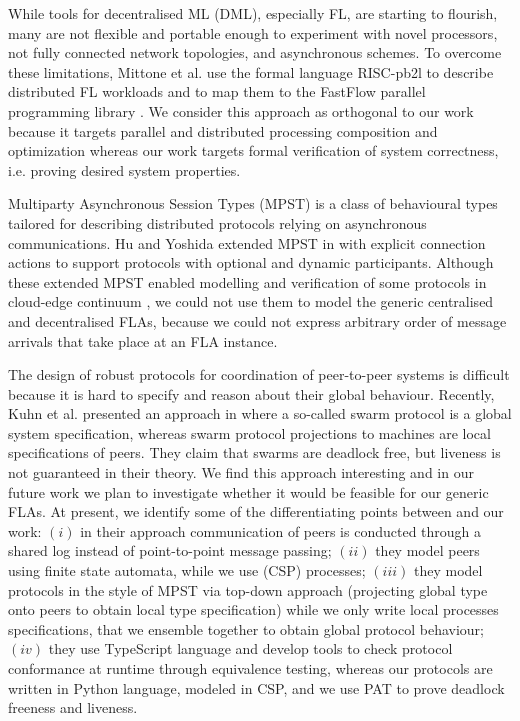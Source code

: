 \documentclass[runningheads]{llncs}
\begin{document}
While tools for decentralised ML (DML), especially FL, are starting to flourish, many are not flexible and portable enough to experiment with novel processors, not fully connected network topologies, and asynchronous schemes. To overcome these limitations, Mittone et al. use the formal language RISC-pb2l to describe distributed FL workloads and to map them to the FastFlow parallel programming library \cite{mittone2023}. We consider this approach as orthogonal to our work because it targets parallel and distributed processing composition and optimization whereas our work targets formal verification of system correctness, i.e. proving desired system properties.

Multiparty Asynchronous Session Types (MPST) is a class of behavioural types tailored for describing distributed protocols relying on asynchronous communications. Hu and Yoshida extended MPST in \cite{HuY17} with explicit connection actions to support protocols with optional and dynamic participants. Although these extended MPST enabled modelling and verification of some protocols in cloud-edge continuum \cite{SimicPDSM21}, we could not use them to model the generic centralised and decentralised FLAs, because we could not express arbitrary order of message arrivals that take place at an FLA instance.

The design of robust protocols for coordination of peer-to-peer systems is difficult because it is hard to specify and reason about their global behaviour. Recently, Kuhn et al. presented an approach in \cite{kuhn2023} where a so-called swarm protocol is a global system specification, whereas swarm protocol projections to machines are local specifications of peers. 
They claim that swarms are deadlock free, but liveness is not guaranteed in their theory. We find this approach interesting and in our future work we plan to investigate whether it would be feasible for our generic FLAs. 
At present, we 
identify some of the differentiating points between \cite{kuhn2023} and our work: $(i)$ in their approach communication of peers is conducted through a shared log instead of point-to-point message passing; 
$(ii)$ they model %
peers using finite state automata, while we use (CSP) processes;
$(iii)$ they model protocols in the style of MPST via top-down approach (projecting global type onto peers to obtain local type specification) while we only write local processes specifications, that we ensemble together to obtain global protocol behaviour; 
$(iv)$ they use TypeScript language and develop tools to check protocol conformance at runtime through equivalence testing, whereas our protocols are written in Python language, 
modeled in CSP, and we use PAT  to prove deadlock freeness and liveness. %
\end{document}

